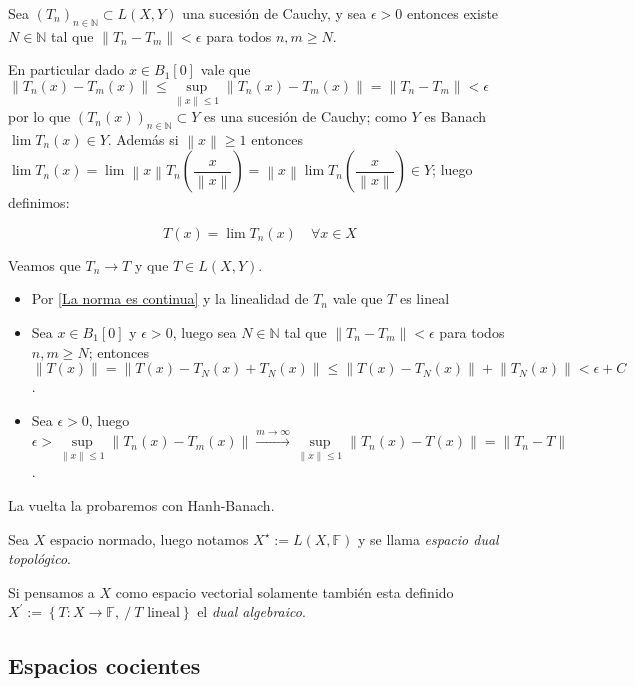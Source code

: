 \documentclass[11pt]{article}
\newcommand{\N}{{\mathbb{N}}}
\newcommand{\norm}[1]{\left\lVert#1\right\rVert}
\newcommand{\sett}[1]{\left\lbrace#1\right\rbrace}
\numberwithin{theorem}{subsection}
\newenvironment{proof}[1][Demostraci\'on]{\begin{trivlist}
		\item[\hskip \labelsep {\bfseries #1}]}{\end{trivlist}}
\newenvironment{definition}[1][Definici\'on]{\begin{trivlist}
		\item[\hskip \labelsep {\bfseries #1}]}{\end{trivlist}}
\newcommand{\qed}{\nobreak \ifvmode \relax \else
	\ifdim\lastskip<1.5em \hskip-\lastskip
	\hskip1.5em plus0em minus0.5em \fi \nobreak
	\vrule height0.75em width0.5em depth0.25em\fi}
\begin{document}
\begin{proof}
	Sea $(T_n)_{n \in \N} \subset L(X,Y)$ una sucesi\'on de Cauchy, y sea $\epsilon > 0$ entonces existe $N \in \N$ tal que $\norm{T_n - T_m} < \epsilon$ para todos $n,m \geq N$.
	
	En particular dado $x \in B_{1}[0]$ vale que ${\norm{T_n(x) - T_m(x)}} \leq  \sup\limits_{\norm{x} \leq 1} {\norm{T_n(x) - T_m(x)}} = \norm{T_n - T_m} < \epsilon$ por lo que $\left(T_n(x)\right)_{n \in \N} \subset Y$ es una sucesi\'on de Cauchy; como $Y$ es Banach $\lim T_n(x) \in Y$. Adem\'as si $\norm{x} \geq 1$ entonces $\lim T_n(x) = \lim \norm{x}T_n\left(\dfrac{x}{\norm{x}}\right) = \norm{x} \lim T_n \left(\dfrac{x}{\norm{x}}\right) \in Y$; luego definimos:
	
	\[
	T(x) = \lim T_n(x) \quad \forall x \in X
	\]
	
	Veamos que $T_n \rightarrow T$ y que $T \in L(X,Y)$.
	
	\begin{itemize}
		
		\item Por \ref{La norma es continua} y la linealidad de $T_n$ vale que $T$ es lineal
		\item Sea $x \in B_1[0]$ y $\epsilon > 0$, luego sea $N \in \N$ tal que $\norm{T_n - T_m} < \epsilon$ para todos $n,m \geq N$; entonces $\norm{T(x)} = \norm{T(x) - T_N(x) + T_N(x)} \leq \norm{T(x) - T_N(x)} + \norm{T_N(x)} < \epsilon + C$.
		
		\item Sea $\epsilon > 0$, luego $\epsilon > \sup\limits_{\norm{x} \leq 1} {\norm{T_n(x) - T_m(x)}} \xrightarrow{m \rightarrow \infty} \sup\limits_{\norm{x} \leq 1} {\norm{T_n(x) - T(x)}} = \norm{T_n - T}$. 
	\end{itemize}
	
	La vuelta la probaremos con Hanh-Banach. \qed
	
\end{proof}

\begin{definition}
	Sea $X$ espacio normado, luego notamos $X^{\star} := L(X, \mathbb{F})$ y se llama \textit{espacio dual topol\'ogico}.
	
	Si pensamos a $X$ como espacio vectorial solamente tambi\'en esta definido $X^{'} := \sett{T:X \rightarrow \mathbb{F}, \ / \ T \text{ lineal}}$ el \textit{ dual algebraico}.

\end{definition}

\subsection{Espacios cocientes}
\end{document}
